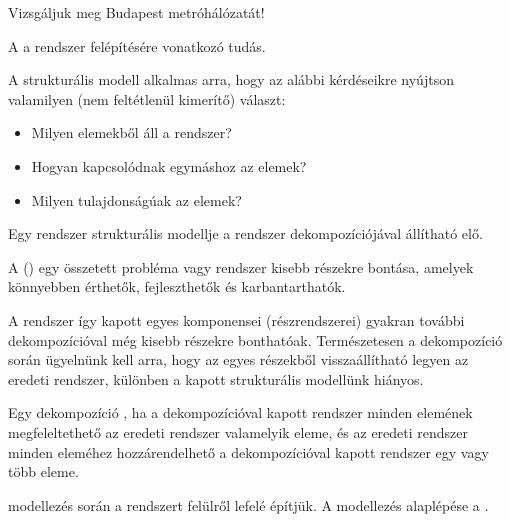 
\begin{pelda}
	Vizsgáljuk meg Budapest metróhálózatát! 
	
\end{pelda}


\begin{definicio}
A  a rendszer felépítésére vonatkozó tudás.
\end{definicio}

A strukturális modell alkalmas arra, hogy az alábbi kérdéseikre nyújtson valamilyen (nem feltétlenül kimerítő) választ:

\begin{itemize}
\item Milyen elemekből áll a rendszer?
\item Hogyan kapcsolódnak egymáshoz az elemek?
\item Milyen tulajdonságúak az elemek?
\end{itemize}

Egy rendszer strukturális modellje a rendszer dekompozíciójával állítható elő.

\begin{definicio}
	A  () egy összetett probléma vagy rendszer kisebb részekre bontása, amelyek könnyebben érthetők, fejleszthetők és karbantarthatók.
\end{definicio}


A rendszer így kapott egyes komponensei (részrendszerei) gyakran további dekompozícióval még kisebb részekre bonthatóak. Természetesen a dekompozíció során ügyelnünk kell arra, hogy az egyes részekből visszaállítható legyen az eredeti rendszer, különben a kapott strukturális modellünk hiányos.

\begin{definicio}
	Egy dekompozíció , ha a dekompozícióval kapott rendszer minden elemének megfeleltethető az eredeti rendszer valamelyik eleme, és az eredeti rendszer minden eleméhez hozzárendelhető a dekompozícióval kapott rendszer egy vagy több eleme.
\end{definicio}

\begin{definicio}
	 modellezés során a rendszert felülről lefelé építjük. A modellezés alaplépése a .
\end{definicio}

